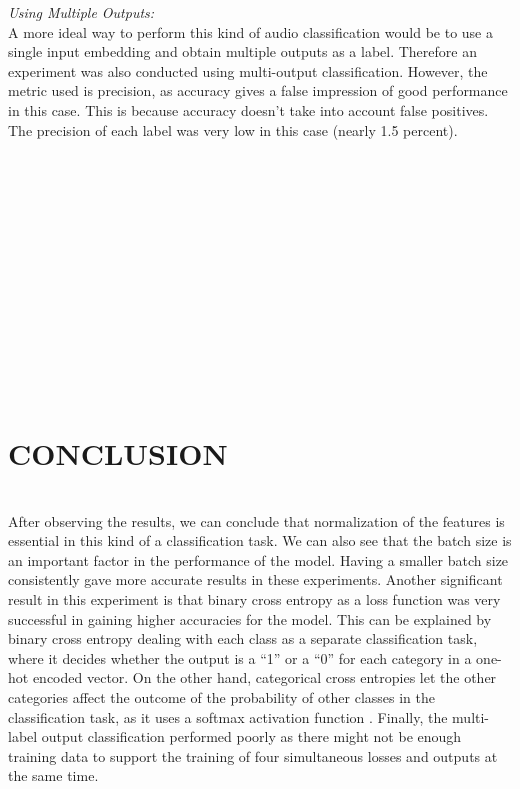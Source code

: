 \documentclass[journal]{IEEEtran}
\begin{document}
\emph{Using Multiple Outputs:}
\\
A more ideal way to perform this kind of audio classification would be to use a single input embedding and obtain multiple outputs as a label. Therefore an experiment was also conducted using multi-output classification. However, the metric used is precision, as accuracy gives a false impression of good performance in this case. This is because accuracy doesn’t take into account false positives. The precision of each label was very low in this case (nearly 1.5 percent). 
\\
\\
\\
\\
\\
\\
\\
\\
\\
\\
\\
\\
\\
\\

\section{CONCLUSION}
\\
After observing the results, we can conclude that normalization of the features is essential in this kind of a classification task. We can also see that the batch size is an important factor in the performance of the model. Having a smaller batch size consistently gave more accurate results in these experiments. Another significant result in this experiment is that binary cross entropy as a loss function was very successful in gaining higher accuracies for the model. This can be explained by binary cross entropy dealing with each class as a separate classification task, where it decides whether the output is a “1” or a “0” for each category in a one-hot encoded vector. On the other hand, categorical cross entropies let the other categories affect the outcome of the probability of other classes in the classification task, as it uses a softmax activation function \cite{12}. Finally, the multi-label output classification performed poorly as there might not be enough training data to support the training of four simultaneous losses and outputs at the same time.
\end{document}
